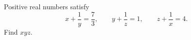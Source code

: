 Positive real numbers satisfy
\[
x+\dfrac{1}{y}=\dfrac{7}{3},\qquad y+\dfrac{1}{z}=1,\qquad z+\dfrac{1}{x}=4.
\]
Find $xyz$.
